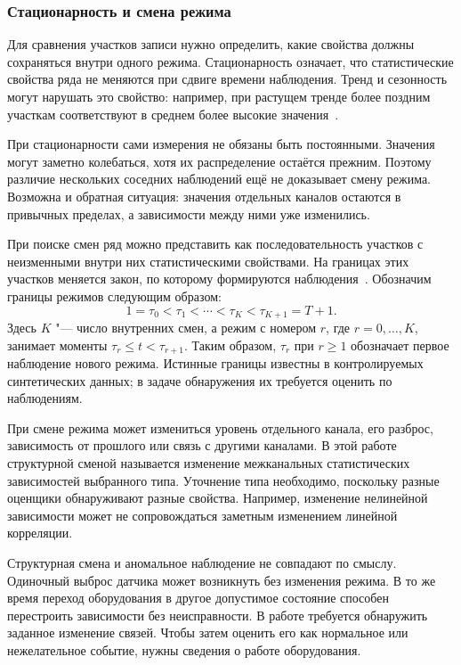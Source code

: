 \documentclass[bachelor, och, diploma]{SCWorks}
\begin{document}
\subsubsection{Стационарность и смена режима}

Для сравнения участков записи нужно определить, какие свойства должны сохраняться внутри одного режима. Стационарность означает, что статистические свойства ряда не меняются при сдвиге времени наблюдения. Тренд и сезонность могут нарушать это свойство: например, при растущем тренде более поздним участкам соответствуют в среднем более высокие значения~\cite{hyndman2021fpp3}.

При стационарности сами измерения не обязаны быть постоянными. Значения могут заметно колебаться, хотя их распределение остаётся прежним. Поэтому различие нескольких соседних наблюдений ещё не доказывает смену режима. Возможна и обратная ситуация: значения отдельных каналов остаются в привычных пределах, а зависимости между ними уже изменились.

При поиске смен ряд можно представить как последовательность участков с неизменными внутри них статистическими свойствами. На границах этих участков меняется закон, по которому формируются наблюдения~\cite{wu2024changepoint}. Обозначим границы режимов следующим образом:
\begin{equation}
    1=\tau_0 < \tau_1 < \cdots < \tau_K < \tau_{K+1}=T+1.
    \label{eq:regime-boundaries}
\end{equation}
Здесь $K$ "--- число внутренних смен, а режим с номером $r$, где $r=0,\ldots,K$, занимает моменты $\tau_r\leq t<\tau_{r+1}$. Таким образом, $\tau_r$ при $r\geq1$ обозначает первое наблюдение нового режима. Истинные границы известны в контролируемых синтетических данных; в задаче обнаружения их требуется оценить по наблюдениям.

При смене режима может измениться уровень отдельного канала, его разброс, зависимость от прошлого или связь с другими каналами. В этой работе структурной сменой называется изменение межканальных статистических зависимостей выбранного типа. Уточнение типа необходимо, поскольку разные оценщики обнаруживают разные свойства. Например, изменение нелинейной зависимости может не сопровождаться заметным изменением линейной корреляции.

Структурная смена и аномальное наблюдение не совпадают по смыслу. Одиночный выброс датчика может возникнуть без изменения режима. В то же время переход оборудования в другое допустимое состояние способен перестроить зависимости без неисправности. В работе требуется обнаружить заданное изменение связей. Чтобы затем оценить его как нормальное или нежелательное событие, нужны сведения о работе оборудования.
\end{document}

